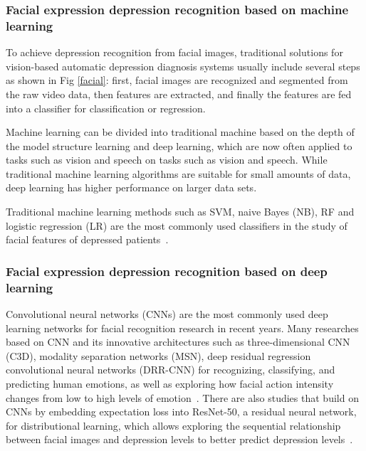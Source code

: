 \subsubsection{Facial expression depression recognition based on machine learning}
\label{sec_fquality}

To achieve depression recognition from facial images, traditional solutions for vision-based automatic depression diagnosis systems usually include several steps as shown in Fig \ref{facial}: first, facial images are recognized and segmented from the raw video data, then features are extracted, and finally the features are fed into a classifier for classification or regression.


Machine learning can be divided into traditional machine based on the depth of the model structure learning and deep learning, which are now often applied to tasks such as vision and speech on tasks such as vision and speech. While traditional machine learning algorithms are suitable for small amounts of data, deep learning has higher performance on larger data sets.

Traditional machine learning methods such as SVM, naive Bayes (NB), RF and logistic regression (LR) are the most commonly used classifiers in the study of facial features of depressed patients~\cite{2017A,2018A,2020Automatic,2021Classifying}.


\subsubsection{Facial expression depression recognition based on deep learning}
\label{sec_fquality}

Convolutional neural networks (CNNs) are the most commonly used deep learning networks for facial recognition research in recent years. Many researches based on CNN and its innovative architectures such as three-dimensional CNN (C3D), modality separation networks (MSN), deep residual regression convolutional neural networks (DRR-CNN) for recognizing, classifying, and predicting human emotions, as well as exploring how facial action intensity changes from low to high levels of emotion~\cite{2019Combining,2019Multi,2020Encoding,2020A,2020Visually,2020Depression}. There are also studies that build on CNNs by embedding expectation loss into ResNet-50, a residual neural network, for distributional learning, which allows exploring the sequential relationship between facial images and depression levels to better predict depression levels~\cite{2019Depression2}.

